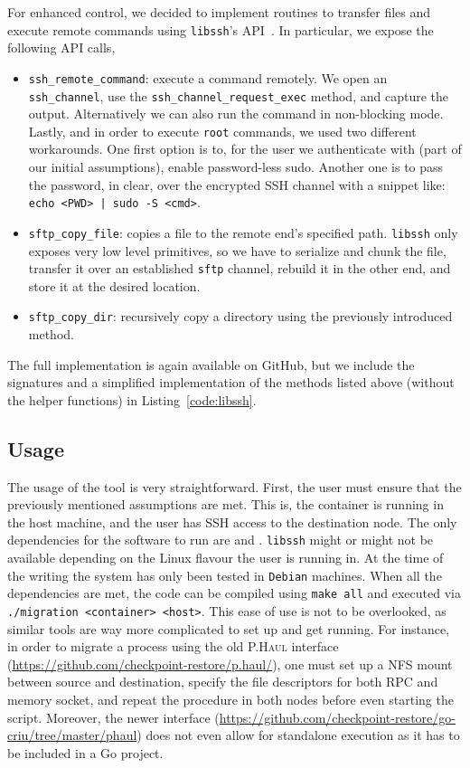 For enhanced control, we decided to implement routines to transfer files and execute remote commands using \texttt{libssh}'s API~\cite{libssh,libssh-api}.
In particular, we expose the following API calls,
\begin{itemize}
    \item \texttt{ssh\_remote\_command}: execute a command remotely. We open an \texttt{ssh\_channel}, use the \texttt{ssh\_channel\_request\_exec} method, and capture the output. Alternatively we can also run the command in non-blocking mode. Lastly, and in order to execute \texttt{root} commands, we used two different workarounds. One first option is to, for the user we authenticate with (part of our initial assumptions), enable password-less sudo. Another one is to pass the password, in clear, over the encrypted SSH channel with a snippet like: \texttt{echo <PWD> | sudo -S <cmd>}.
    \item \texttt{sftp\_copy\_file}: copies a file to the remote end's specified path. \texttt{libssh} only exposes very low level primitives, so we have to serialize and chunk the file, transfer it over an established \texttt{sftp} channel, rebuild it in the other end, and store it at the desired location.
    \item \texttt{sftp\_copy\_dir}: recursively copy a directory using the previously introduced method.
\end{itemize}
The full implementation is again available on GitHub, but we include the signatures and a simplified implementation of the methods listed above (without the helper functions) in Listing~\ref{code:libssh}.

\subsection{Usage}

The usage of the tool is very straightforward.
First, the user must ensure that the previously mentioned assumptions are met.
This is, the container is running in the host machine, and the user has SSH access to the destination node.
The only dependencies for the software to run are \criu and \runc.
\texttt{libssh} might or might not be available depending on the Linux flavour the user is running in.
At the time of the writing the system has only been tested in \texttt{Debian} machines.
When all the dependencies are met, the code can be compiled using \texttt{make all} and executed via \texttt{./migration <container> <host>}.
This ease of use is not to be overlooked, as similar tools are way more complicated to set up and get running.
For instance, in order to migrate a process using the old \textsc{P.Haul} interface (\url{https://github.com/checkpoint-restore/p.haul/}), one must set up a NFS mount between source and destination, specify the file descriptors for both RPC and memory socket, and repeat the procedure in both nodes before even starting the script.
Moreover, the newer interface (\url{https://github.com/checkpoint-restore/go-criu/tree/master/phaul}) does not even allow for standalone execution as it has to be included in a Go project.
